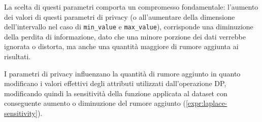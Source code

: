 La scelta di questi parametri comporta un compromesso fondamentale: l'aumento dei valori di questi parametri di privacy (o all'aumentare della dimensione dell'intervallo nel caso di \texttt{min\_value} e \texttt{max\_value}), corrisponde una diminuzione della perdita di informazione, dato che una minore porzione dei dati verrebbe ignorata o distorta, ma anche una quantità maggiore di rumore aggiunta ai risultati.

I parametri di privacy influenzano la quantità di rumore aggiunto in quanto modificano i valori effettivi degli attributi utilizzati dall'operazione DP, modificando quindi la sensitività della funzione applicata al dataset con conseguente aumento o diminuzione del rumore aggiunto (\ref{expr:laplace-sensitivity}).